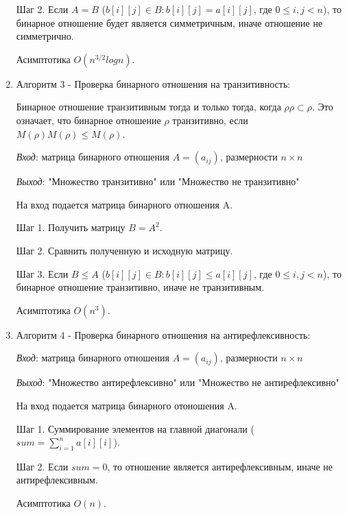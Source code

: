 \documentclass[spec, och, labwork]{shiza}
\begin{document}
\begin{enumerate}
                Шаг 2. Если $A = B$ ($b[i][j] \in B: b[i][j] = a[i][j] $, где $0 \leq i, j < n$), то бинарное отношение будет является симметричным, иначе отношение не симметрично.

                Асимптотика $O(n^{3/2}logn)$.

                \item Алгоритм 3 - Проверка бинарного отношения на транзитивность:
                
                Бинарное отношение транзитивным тогда и только тогда, когда $\rho \rho \subset \rho$. Это означает, что бинарное
                отношение $\rho$ транзитивно, если $M(\rho)M(\rho) \leq M(\rho)$.
                
                \textit{Вход}: матрица бинарного отношения $A = (a_{ij})$, размерности $n \times n$

                \textit{Выход}: "Множество транзитивно" или "Множество не транзитивно"
                
                На вход подается матрица бинарного отношения A. 
                
                Шаг 1. Получить матрицу $B = A^2$.
                
                Шаг 2. Сравнить полученную и исходную матрицу.
                
                Шаг 3. Если $B \leq A$ ($b[i][j] \in B: b[i][j] \leq a[i][j]$, где $0 \leq i, j < n$), то бинарное отношение транзитивно, иначе не транзитивным.

                Асимптотика $O(n^3)$.

                \item Алгоритм 4 - Проверка бинарного отношения на антирефлексивность:

                \textit{Вход}: матрица бинарного отношения $A = (a_{ij})$, размерности $n \times n$

                \textit{Выход}: "Множество антирефлексивно" или "Множество не антирефлексивно"
                
                На вход подается матрица бинарного отоношения A.

                Шаг 1. Суммирование элементов на главной диагонали ($sum = \sum\limits_{i=1}^n a[i][i]$).
                
                Шаг 2. Если $sum = 0$, то отношение является антирефлексивным, иначе не антирефлексивным.

                Асимптотика $O(n)$.


\end{enumerate}
\end{document}
